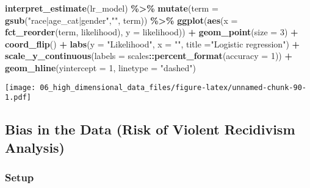 \documentclass[
]{book}
\newenvironment{Shaded}{\begin{snugshade}}{\end{snugshade}}
\newcommand{\DataTypeTok}[1]{\textcolor[rgb]{0.13,0.29,0.53}{#1}}
\newcommand{\DecValTok}[1]{\textcolor[rgb]{0.00,0.00,0.81}{#1}}
\newcommand{\KeywordTok}[1]{\textcolor[rgb]{0.13,0.29,0.53}{\textbf{#1}}}
\newcommand{\NormalTok}[1]{#1}
\newcommand{\OperatorTok}[1]{\textcolor[rgb]{0.81,0.36,0.00}{\textbf{#1}}}
\newcommand{\StringTok}[1]{\textcolor[rgb]{0.31,0.60,0.02}{#1}}
\begin{document}
\begin{Shaded}
\begin{Highlighting}[]
\KeywordTok{interpret\_estimate}\NormalTok{(lr\_model) }\OperatorTok{\%\textgreater{}\%}
\StringTok{    }\KeywordTok{mutate}\NormalTok{(}\DataTypeTok{term =} \KeywordTok{gsub}\NormalTok{(}\StringTok{"race|age\_cat|gender"}\NormalTok{,}\StringTok{""}\NormalTok{, term)) }\OperatorTok{\%\textgreater{}\%}\StringTok{ }
\StringTok{    }\KeywordTok{ggplot}\NormalTok{(}\KeywordTok{aes}\NormalTok{(}\DataTypeTok{x =} \KeywordTok{fct\_reorder}\NormalTok{(term, likelihood), }\DataTypeTok{y =}\NormalTok{ likelihood)) }\OperatorTok{+}
\StringTok{        }\KeywordTok{geom\_point}\NormalTok{(}\DataTypeTok{size =} \DecValTok{3}\NormalTok{) }\OperatorTok{+}
\StringTok{        }\KeywordTok{coord\_flip}\NormalTok{() }\OperatorTok{+}
\StringTok{        }\KeywordTok{labs}\NormalTok{(}\DataTypeTok{y =} \StringTok{"Likelihood"}\NormalTok{, }\DataTypeTok{x =} \StringTok{""}\NormalTok{,}
            \DataTypeTok{title =}\StringTok{"Logistic regression"}\NormalTok{) }\OperatorTok{+}
\StringTok{        }\KeywordTok{scale\_y\_continuous}\NormalTok{(}\DataTypeTok{labels =}\NormalTok{ scales}\OperatorTok{::}\KeywordTok{percent\_format}\NormalTok{(}\DataTypeTok{accuracy =} \DecValTok{1}\NormalTok{)) }\OperatorTok{+}
\StringTok{        }\KeywordTok{geom\_hline}\NormalTok{(}\DataTypeTok{yintercept =} \DecValTok{1}\NormalTok{, }\DataTypeTok{linetype =} \StringTok{"dashed"}\NormalTok{)}
\end{Highlighting}
\end{Shaded}

\texttt{[image: 06\_high\_dimensional\_data\_files/figure-latex/unnamed-chunk-90-1.pdf]}

\hypertarget{bias-in-the-data-risk-of-violent-recidivism-analysis}{%
\subsection{Bias in the Data (Risk of Violent Recidivism Analysis)}\label{bias-in-the-data-risk-of-violent-recidivism-analysis}}

\hypertarget{setup-5}{%
\subsubsection{Setup}\label{setup-5}}
\end{document}
